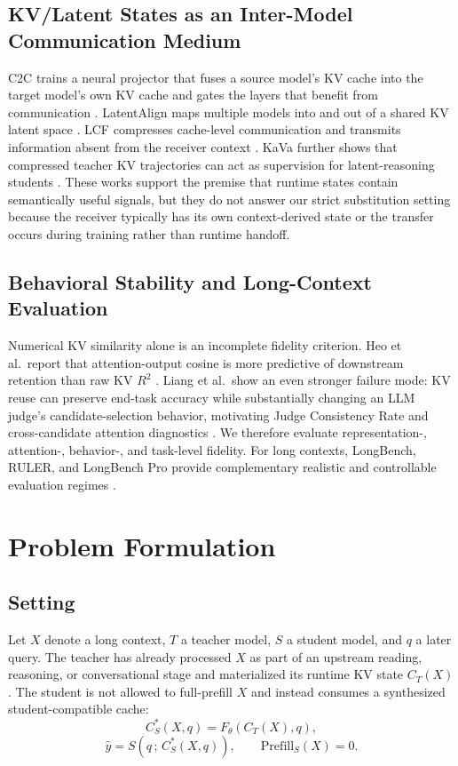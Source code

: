 \documentclass[10pt]{article}
\begin{document}
\subsection{KV/Latent States as an Inter-Model Communication Medium}
C2C trains a neural projector that fuses a source model's KV cache into the target model's own KV
cache and gates the layers that benefit from communication \cite{fu2025c2c}. LatentAlign maps
multiple models into and out of a shared KV latent space \cite{dery2026latentalign}. LCF compresses
cache-level communication and transmits information absent from the receiver context
\cite{rossi2026latentcacheflow}. KaVa further shows that compressed teacher KV trajectories can
act as supervision for latent-reasoning students \cite{kuzina2026kava}. These works support the
premise that runtime states contain semantically useful signals, but they do not answer our strict
substitution setting because the receiver typically has its own context-derived state or the
transfer occurs during training rather than runtime handoff.

\subsection{Behavioral Stability and Long-Context Evaluation}
Numerical KV similarity alone is an incomplete fidelity criterion. Heo et al.\ report that
attention-output cosine is more predictive of downstream retention than raw KV $R^2$
\cite{heo2026crossmodel}. Liang et al.\ show an even stronger failure mode: KV reuse can preserve
end-task accuracy while substantially changing an LLM judge's candidate-selection behavior,
motivating Judge Consistency Rate and cross-candidate attention diagnostics
\cite{liang2026kvjudge}. We therefore evaluate representation-, attention-, behavior-, and
task-level fidelity. For long contexts, LongBench, RULER, and LongBench Pro provide complementary
realistic and controllable evaluation regimes \cite{bai2023longbench,hsieh2024ruler,chen2026longbenchpro}.

\section{Problem Formulation}
\subsection{Setting}
Let $X$ denote a long context, $T$ a teacher model, $S$ a student model, and $q$ a later query.
The teacher has already processed $X$ as part of an upstream reading, reasoning, or conversational
stage and materialized its runtime KV state $C_T(X)$. The student is not allowed to full-prefill
$X$ and instead consumes a synthesized student-compatible cache:
\begin{equation}
  C_S^*(X,q) = F_\theta(C_T(X), q),
\label{eq:synthesis}
\end{equation}
\begin{equation}
  \hat y = S(q\,;\, C_S^*(X,q)), \qquad \mathrm{Prefill}_S(X) = 0.
\label{eq:no-prefill}
\end{equation}
\end{document}
